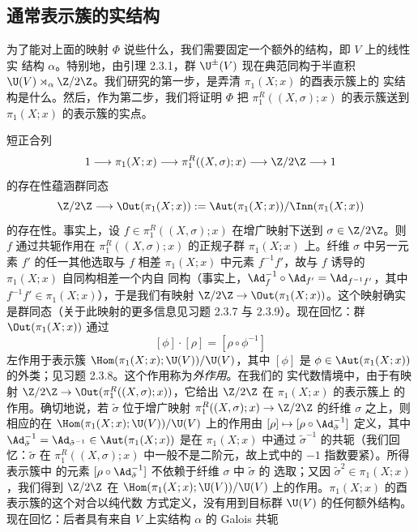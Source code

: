 \subsection{通常表示簇的实结构}
\label{sec:02.3.2}

为了能对上面的映射 $\Phi$ 说些什么，我们需要固定一个额外的结构，即 $V$ 上的线性实
结构 $\alpha$。特别地，由引理 2.3.1，群 $\U^{\pm}(V)$ 现在典范同构于半直积
$\U(V)\rtimes_\alpha\Z/2\Z$。我们研究的第一步，是弄清 $\pi_1(X;x)$ 的酉表示簇上的
实结构是什么。然后，作为第二步，我们将证明 $\Phi$ 把
$\pi^R_1((X,\sigma);x)$ 的表示簇送到 $\pi_1(X;x)$ 的表示簇的实点。

短正合列
\[
1\longrightarrow\pi_1(X;x)\longrightarrow\pi^R_1((X,\sigma);x)
\longrightarrow\Z/2\Z\longrightarrow1
\]
的存在性蕴涵群同态
\[
\Z/2\Z\longrightarrow\Out(\pi_1(X;x)):=
\Aut(\pi_1(X;x))/\Inn(\pi_1(X;x))
\]
的存在性。事实上，设 $f\in\pi^R_1((X,\sigma);x)$ 在增广映射下送到
$\sigma\in\Z/2\Z$。则 $f$ 通过共轭作用在 $\pi^R_1((X,\sigma);x)$ 的正规子群
$\pi_1(X;x)$ 上。纤维 $\sigma$ 中另一元素 $f'$ 的任一其他选取与 $f$ 相差
$\pi_1(X;x)$ 中元素 $f^{-1}f'$，故与 $f$ 诱导的 $\pi_1(X;x)$ 自同构相差一个内自
同构（事实上，$\Ad_f^{-1}\circ\Ad_{f'}=\Ad_{f^{-1}f'}$，其中
$f^{-1}f'\in\pi_1(X;x)$），于是我们有映射
$\Z/2\Z\to\Out(\pi_1(X;x))$。这个映射确实是群同态（关于此映射的更多信息见习题
2.3.7 与 2.3.9）。现在回忆：群 $\Out(\pi_1(X;x))$ 通过
\begin{equation}\label{eq:2.23}
[\phi]\cdot[\rho]=[\rho\circ\phi^{-1}]
\end{equation}
左作用于表示簇 $\Hom(\pi_1(X;x);\U(V))/\U(V)$，其中 $[\phi]$ 是
$\phi\in\Aut(\pi_1(X;x))$ 的外类；见习题 2.3.8。这个作用称为\emph{外作用}。在我们的
实代数情境中，由于有映射
$\Z/2\Z\to\Out(\pi^R_1((X,\sigma);x))$，它给出 $\Z/2\Z$ 在 $\pi_1(X;x)$ 的表示簇上
的作用。确切地说，若 $\tilde\sigma$ 位于增广映射
$\pi^R_1((X,\sigma);x)\to\Z/2\Z$ 的纤维 $\sigma$ 之上，则相应的在
$\Hom(\pi_1(X;x);\U(V))/\U(V)$ 上的作用由
$[\rho]\mapsto[\rho\circ\Ad_{\tilde\sigma}^{-1}]$ 定义，其中
$\Ad_{\tilde\sigma}^{-1}=\Ad_{\tilde\sigma^{-1}}\in\Aut(\pi_1(X;x))$ 是在
$\pi_1(X;x)$ 中通过 $\tilde\sigma^{-1}$ 的共轭（我们回忆：$\tilde\sigma$ 在
$\pi^R_1((X,\sigma);x)$ 中一般不是二阶元，故上式中的 $-1$ 指数要紧）。所得表示簇中
的元素 $[\rho\circ\Ad_{\tilde\sigma}^{-1}]$ 不依赖于纤维 $\sigma$ 中 $\tilde\sigma$ 的
选取；又因 $\tilde\sigma^2\in\pi_1(X;x)$，我们得到 $\Z/2\Z$ 在
$\Hom(\pi_1(X;x);\U(V))/\U(V)$ 上的作用。$\pi_1(X;x)$ 的酉表示簇的这个对合以纯代数
方式定义，没有用到目标群 $\U(V)$ 的任何额外结构。现在回忆：后者具有来自 $V$ 上实结构
$\alpha$ 的 Galois 共轭
